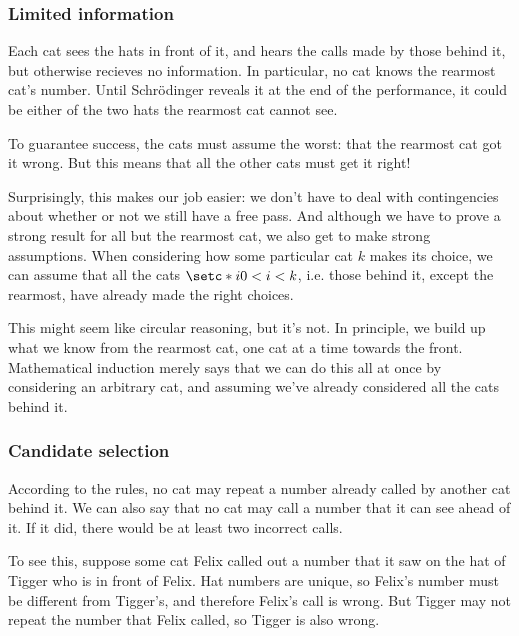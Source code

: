 \documentclass[10pt,a4paper]{scrartcl}
\begin{document}
\subsubsection{Limited information}

Each cat sees the hats in front of it, and hears the calls made by those behind
it, but otherwise recieves no information. In particular, no cat knows the
rearmost cat's number. Until Schr\"odinger reveals it at the end of the
performance, it could be either of the two hats the rearmost cat cannot see.

To guarantee success, the cats must assume the worst: that the rearmost cat got
it wrong. But this means that all the other cats must get it right!

Surprisingly, this makes our job easier: we don't have to deal with
contingencies about whether or not we still have a free pass. And although we
have to prove a strong result for all but the rearmost cat, we also get to make
strong assumptions. When considering how some particular cat $k$ makes its
choice, we can assume that all the cats $\setc*{i}{0 < i < k}$, i.e. those
behind it, except the rearmost, have already made the right choices.

This might seem like circular reasoning, but it's not. In principle, we build
up what we know from the rearmost cat, one cat at a time towards the front.
Mathematical induction merely says that we can do this all at once by
considering an arbitrary cat, and assuming we've already considered all the
cats behind it.

\subsubsection{Candidate selection}

According to the rules, no cat may repeat a number already called by another
cat behind it. We can also say that no cat may call a number that it can see
ahead of it. If it did, there would be at least two incorrect calls.

To see this, suppose some cat Felix called out a number that it saw on the hat
of Tigger who is in front of Felix. Hat numbers are unique, so Felix's number
must be different from Tigger's, and therefore Felix's call is wrong. But
Tigger may not repeat the number that Felix called, so Tigger is also wrong.


\end{document}
